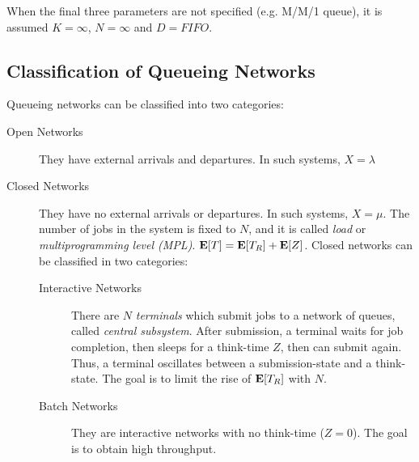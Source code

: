When the final three parameters are not specified (e.g. M/M/1 queue), it is assumed $K=\infty$, $N=\infty$ and $D=FIFO$.




\subsection{Classification of Queueing Networks}
\label{sec:Classification-Queueing-Networks}

Queueing networks can be classified into two categories:

\begin{description}
	\item [Open Networks] They have external arrivals and departures. In such systems, $X=\lambda$
	
	\item [Closed Networks] They have no external arrivals or departures. In such systems, $X=\mu$. The number of jobs in the system is fixed to $N$, and it is called \textit{load} or \textit{multiprogramming level (MPL)}. $\mathbf{E}[T]=\mathbf{E}[T_{R}]+\mathbf{E}[Z]$. Closed networks can be classified in two categories:
	
	\begin{description}
		\item [Interactive Networks] There are $N$ \textit{terminals} which submit jobs to a network of queues, called \textit{central subsystem}. After submission, a terminal waits for job completion, then sleeps for a think-time $Z$, then can submit again. Thus, a terminal oscillates between a submission-state and a think-state. The goal is to limit the rise of $\mathbf{E}[T_{R}]$ with $N$.
		
		\item [Batch Networks] They are interactive networks with no think-time ($Z=0$). The goal is to obtain high throughput.
	\end{description}		
	
\end{description}



